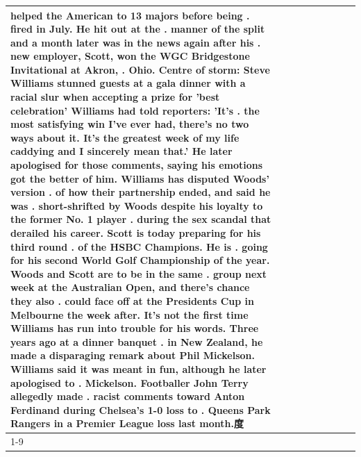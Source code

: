 \begin{table}[H]
\begin{tabular}{lllrlllll}
helped the American to 13 majors before being . fired in July. He hit out at the . manner of the split and a month later was in the news again after his . new employer, Scott, won the WGC Bridgestone Invitational at Akron, . Ohio. Centre of storm: Steve Williams stunned guests at a gala dinner with a racial slur when accepting a prize for 'best celebration' Williams had told reporters: 'It's . the most satisfying win I've ever had, there's no two ways about it. It's the greatest week of my life caddying and I sincerely mean that.' He later apologised for those comments, saying his emotions got the better of him. Williams has disputed Woods' version . of how their partnership ended, and said he was . short-shrifted by Woods despite his loyalty to the former No. 1 player . during the sex scandal that derailed his career. Scott is today preparing for his third round . of the HSBC Champions. He is . going for his second World Golf Championship of the year. Woods and Scott are to be in the same . group next week at the Australian Open, and there's chance they also . could face off at the Presidents Cup in Melbourne the week after. It's not the first time Williams has run into trouble for his words. Three years ago at a dinner banquet . in New Zealand, he made a disparaging remark about Phil Mickelson. Williams said it was meant in fun, although he later apologised to . Mickelson. Footballer John Terry allegedly made . racist comments toward Anton Ferdinand during Chelsea's 1-0 loss to . Queens Park Rangers in a Premier League loss last month.度 \\
\cline{1-9}

\end{tabular}
\end{table}
